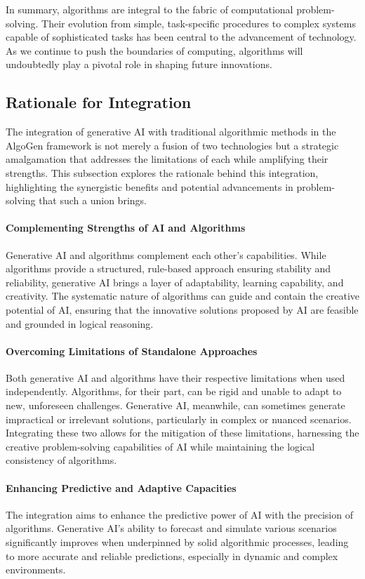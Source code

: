 \documentclass{article}
\begin{document}
In summary, algorithms are integral to the fabric of computational problem-solving. Their evolution from simple, task-specific procedures to complex systems capable of sophisticated tasks has been central to the advancement of technology. As we continue to push the boundaries of computing, algorithms will undoubtedly play a pivotal role in shaping future innovations.


\subsection{Rationale for Integration}

The integration of generative AI with traditional algorithmic methods in the AlgoGen framework is not merely a fusion of two technologies but a strategic amalgamation that addresses the limitations of each while amplifying their strengths. This subsection explores the rationale behind this integration, highlighting the synergistic benefits and potential advancements in problem-solving that such a union brings.

\paragraph{Complementing Strengths of AI and Algorithms}
Generative AI and algorithms complement each other’s capabilities. While algorithms provide a structured, rule-based approach ensuring stability and reliability, generative AI brings a layer of adaptability, learning capability, and creativity. The systematic nature of algorithms can guide and contain the creative potential of AI, ensuring that the innovative solutions proposed by AI are feasible and grounded in logical reasoning.

\paragraph{Overcoming Limitations of Standalone Approaches}
Both generative AI and algorithms have their respective limitations when used independently. Algorithms, for their part, can be rigid and unable to adapt to new, unforeseen challenges. Generative AI, meanwhile, can sometimes generate impractical or irrelevant solutions, particularly in complex or nuanced scenarios. Integrating these two allows for the mitigation of these limitations, harnessing the creative problem-solving capabilities of AI while maintaining the logical consistency of algorithms.

\paragraph{Enhancing Predictive and Adaptive Capacities}
The integration aims to enhance the predictive power of AI with the precision of algorithms. Generative AI's ability to forecast and simulate various scenarios significantly improves when underpinned by solid algorithmic processes, leading to more accurate and reliable predictions, especially in dynamic and complex environments.
\end{document}
